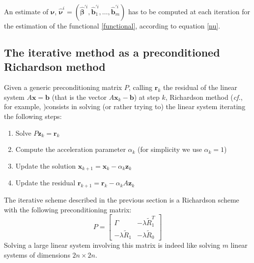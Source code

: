 An estimate of $\bm{\nu}$, $\hat{\bm{\nu}}^i = (\hat{\bm{\beta}}^{\prime i},
	\hat{\bm{b}}_1^{\prime i}, \dots, \hat{\bm{b}}_m^{\prime i})$ has to be
computed at each iteration for the estimation of the functional
\ref{functional}, according to equation \ref{nu}.

\subsection{The iterative method as a preconditioned Richardson method}
Given a generic preconditioning matrix $P$, calling $\bm{r}_k$ the residual of
the linear system $A \bm{x} = \bm{b}$ (that is the vector $A \bm{x}_k -
	\bm{b}$) at step $k$, Richardson method (\textit{cf.}, for example,
\cite{Quarteroni})consists in solving (or rather trying to) the linear system
iterating the following steps:
\begin{enumerate}
	\item Solve $P \bm{z}_k = \bm{r}_k$
	\item Compute the acceleration parameter $\alpha_k$ (for simplicity we use $\alpha_k = 1$)
	\item Update the solution $ \bm{x}_{k+1} = \bm{x}_{k} - \alpha_k \bm{z}_k $
	\item Update the residual $\bm{r}_{k+1} = \bm{r}_{k} - \alpha_k A \bm{z}_k$
\end{enumerate}

The iterative scheme described in the previous section is a Richardson scheme
with the following preconditioning matrix:
\begin{equation}
	\label{precond}
	P=
	\begin{bmatrix}
		\Gamma               & -\lambda \tilde{R}_1^T \\
		-\lambda \tilde{R}_1 & -\lambda \tilde{R}_0
	\end{bmatrix}
\end{equation}
Solving a large linear system involving this matrix is indeed like
solving $m$ linear systems of dimensions $2n\times 2n$.

